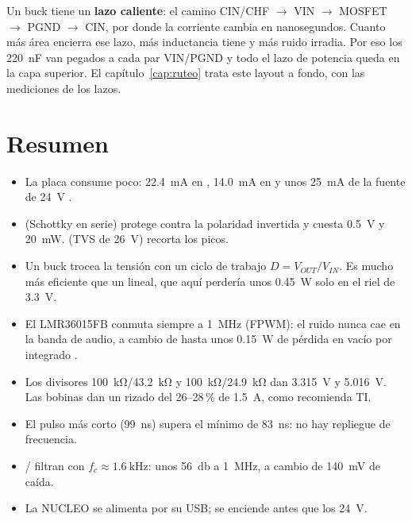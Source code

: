 Un buck tiene un \textbf{lazo caliente}: el camino CIN/CHF $\to$ VIN $\to$ MOSFET $\to$ PGND $\to$ CIN, por donde la corriente cambia en nanosegundos. Cuanto más área encierra ese lazo, más inductancia tiene y más ruido irradia. Por eso los \SI{220}{\nano\farad} van pegados a cada par VIN/PGND y todo el lazo de potencia queda en la capa superior. El capítulo~\ref{cap:ruteo} trata este layout a fondo, con las mediciones de los lazos.

\section*{Resumen}
\begin{itemize}
  \item La placa consume poco: \SI{22.4}{\milli\ampere} en , \SI{14.0}{\milli\ampere} en  y unos \SI{25}{\milli\ampere} de la fuente de \SI{24}{\volt} \estimado.
  \item {} (Schottky en serie) protege contra la polaridad invertida y cuesta \SI{0.5}{\volt} y \SI{20}{\milli\watt}.  (TVS de \SI{26}{\volt}) recorta los picos.
  \item Un buck trocea la tensión con un ciclo de trabajo $D=V_{OUT}/V_{IN}$. Es mucho más eficiente que un lineal, que aquí perdería unos \SI{0.45}{\watt} solo en el riel de \SI{3.3}{\volt}.
  \item El LMR36015FB conmuta siempre a \SI{1}{\mega\hertz} (FPWM): el ruido nunca cae en la banda de audio, a cambio de hasta unos \SI{0.15}{\watt} de pérdida en vacío por integrado \estimado.
  \item Los divisores \SI{100}{\kilo\ohm}/\SI{43.2}{\kilo\ohm} y \SI{100}{\kilo\ohm}/\SI{24.9}{\kilo\ohm} dan \SI{3.315}{\volt} y \SI{5.016}{\volt}. Las bobinas dan un rizado del 26--28\,\% de \SI{1.5}{\ampere}, como recomienda TI.
  \item El pulso más corto (\SI{99}{\nano\second}) supera el mínimo de \SI{83}{\nano\second}: no hay repliegue de frecuencia.
  \item {}/ filtran  con $f_c\approx\SI{1.6}{\kilo\hertz}$: unos \SI{56}{\decibel} a \SI{1}{\mega\hertz}, a cambio de \SI{140}{\milli\volt} de caída.
  \item La NUCLEO se alimenta por su USB; se enciende antes que los \SI{24}{\volt}.
\end{itemize}
